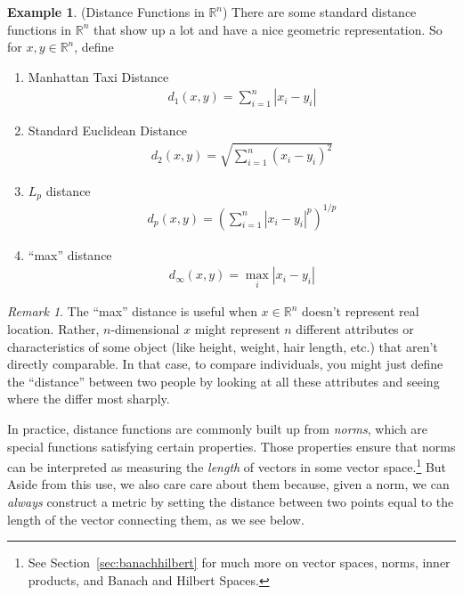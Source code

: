 \documentclass[12pt]{article}
\numberwithin{equation}{section} %
\theoremstyle{plain}
\theoremstyle{definition}
\newtheorem{ex}[thm]{Example}
\theoremstyle{remark}
\newtheorem*{rmk}{Remark}
\newcommand{\R}{\mathbb{R}}
\begin{document}
\begin{ex}{(Distance Functions in $\R^n$)}
There are some standard distance functions in $\R^n$ that show
up a lot and have a nice geometric representation. So for $x,y\in
\R^n$, define
\begin{enumerate}
  \item Manhattan Taxi Distance
    \begin{align*}
      d_1(x,y) = \sum^n_{i=1} |x_i - y_i|
    \end{align*}

  \item Standard Euclidean Distance
    \begin{align*}
      d_2(x,y) = \sqrt{\sum^n_{i=1} (x_i - y_i)^2}
    \end{align*}

  \item $L_p$ distance
    \begin{align*}
      d_p(x,y) = \left(\sum^n_{i=1} |x_i - y_i|^p\right)^{1/p}
    \end{align*}

  \item ``max'' distance
    \begin{align*}
      d_\infty(x,y) = \max_{i} |x_i-y_i|
    \end{align*}

\end{enumerate}
\end{ex}
\begin{rmk}
The ``max'' distance is useful when $x\in\R^n$ doesn't represent
real location. Rather, $n$-dimensional $x$ might represent $n$ different
attributes or characteristics of some object (like height, weight, hair
length, etc.) that aren't directly comparable. In that case, to compare
individuals, you might just define the ``distance'' between two people
by looking at all these attributes and seeing where the differ most
sharply.
\end{rmk}


In practice, distance functions are commonly built up from \emph{norms},
which are special functions satisfying certain properties.  Those
properties ensure that norms can be interpreted as measuring the
\emph{length} of vectors in some vector space.\footnote{%
  See Section~\ref{sec:banachhilbert} for much more on vector spaces,
  norms, inner products, and Banach and Hilbert Spaces.
}
But Aside from this use, we also care care about them because, given a
norm, we can \emph{always} construct a metric by setting the distance
between two points equal to the length of the vector connecting them, as
we see below.
\end{document}
